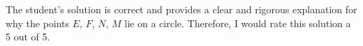 The student's solution is correct and provides a clear and rigorous explanation for why the points $E$, $F$, $N$, $M$ lie on a circle. Therefore, I would rate this solution a 5 out of 5.
